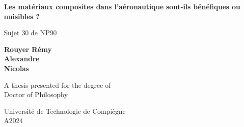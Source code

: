\documentclass[11pt]{article}
\begin{document}
\begin{titlepage}
    \begin{center}
        \vspace*{1cm}

        \Huge
        \textbf{Les matériaux composites dans l'aéronautique sont-ils
        bénéfiques ou nuisibles ?}

        \vspace{0.5cm}
        \LARGE
        Sujet 30 de NP90

        \vspace{1.5cm}

        \textbf{Rouyer Rémy \\ Alexandre \\ Nicolas}

        \vfill

        A thesis presented for the degree of\\
        Doctor of Philosophy

        \vspace{0.8cm}


        \Large
        Université de Technologie de Compiègne\\
        A2024

    \end{center}
\end{titlepage}
\end{document}

